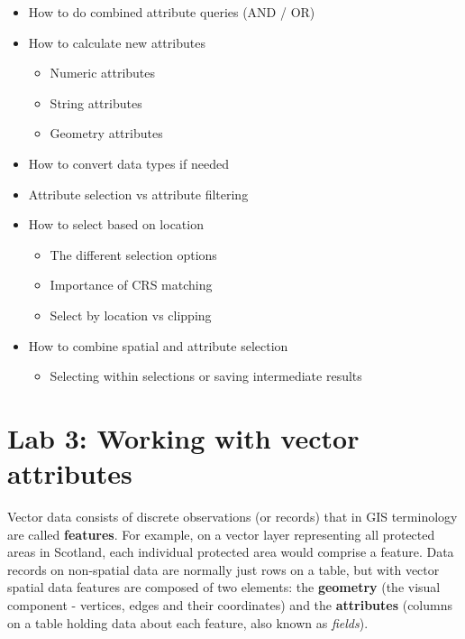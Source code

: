 \documentclass[
  letterpaper,
  DIV=11,
  numbers=noendperiod]{scrreprt}
\providecommand{\tightlist}{%
  \setlength{\itemsep}{0pt}\setlength{\parskip}{0pt}}\usepackage{longtable,booktabs,array}
\begin{document}
\begin{itemize}
\tightlist
\item
  How to do combined attribute queries (AND / OR)
\item
  How to calculate new attributes

  \begin{itemize}
  \tightlist
  \item
    Numeric attributes
  \item
    String attributes
  \item
    Geometry attributes\\
  \end{itemize}
\item
  How to convert data types if needed
\item
  Attribute selection vs attribute filtering
\item
  How to select based on location

  \begin{itemize}
  \tightlist
  \item
    The different selection options
  \item
    Importance of CRS matching
  \item
    Select by location vs clipping
  \end{itemize}
\item
  How to combine spatial and attribute selection

  \begin{itemize}
  \tightlist
  \item
    Selecting within selections or saving intermediate results
  \end{itemize}
\end{itemize}

\chapter{Lab 3: Working with vector attributes}\label{sec-labvec1}

Vector data consists of discrete observations (or records) that in GIS
terminology are called \textbf{features}. For example, on a vector layer
representing all protected areas in Scotland, each individual protected
area would comprise a feature. Data records on non-spatial data are
normally just rows on a table, but with vector spatial data features are
composed of two elements: the \textbf{geometry} (the visual component -
vertices, edges and their coordinates) and the \textbf{attributes}
(columns on a table holding data about each feature, also known as
\emph{fields}).
\end{document}
